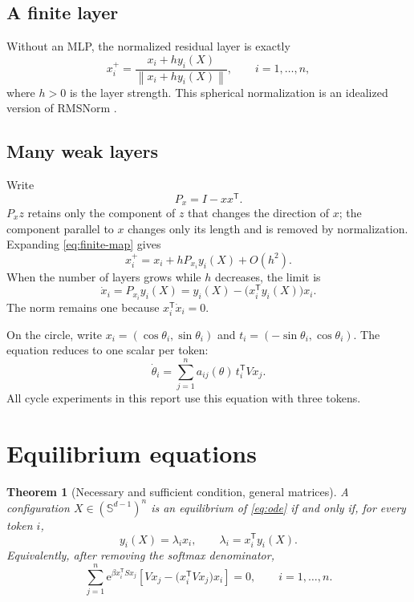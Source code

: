 \documentclass[11pt,a4paper]{article}
\newtheorem{theorem}{Theorem}[section]
\theoremstyle{definition}
\newcommand{\sphere}{\mathbb S}
\newcommand{\e}{\mathrm e}
\newcommand{\T}{\mathsf T}
\newcommand{\norm}[1]{\left\lVert #1\right\rVert}
\begin{document}
\subsection{A finite layer}

Without an MLP, the normalized residual layer is exactly
\begin{equation}
 x_i^+=\frac{x_i+h y_i(X)}{\norm{x_i+h y_i(X)}} ,
 \qquad i=1,\ldots,n,                                      \label{eq:finite-map}
\end{equation}
where $h>0$ is the layer strength. This spherical normalization is an idealized
version of RMSNorm \cite{zhang2019rmsnorm}.

\subsection{Many weak layers}

Write
\[
 P_x=I-xx^{\T}.
\]
$P_xz$ retains only the component of $z$ that changes the direction of $x$; the
component parallel to $x$ changes only its length and is removed by normalization.
Expanding \eqref{eq:finite-map} gives
\[
 x_i^+=x_i+hP_{x_i}y_i(X)+O(h^2).
\]
When the number of layers grows while $h$ decreases, the limit is
\begin{equation}
 \boxed{\quad \dot x_i=P_{x_i}y_i(X)
 =y_i(X)-\bigl(x_i^{\T}y_i(X)\bigr)x_i.\quad}              \label{eq:ode}
\end{equation}
The norm remains one because $x_i^{\T}\dot x_i=0$.

On the circle, write $x_i=(\cos\theta_i,\sin\theta_i)$ and
$t_i=(-\sin\theta_i,\cos\theta_i)$. The equation reduces to one scalar per token:
\begin{equation}
 \dot\theta_i=\sum_{j=1}^n a_{ij}(\theta)\,t_i^{\T}Vx_j.  \label{eq:circle}
\end{equation}
All cycle experiments in this report use this equation with three tokens.

\section{Equilibrium equations}
\label{sec:equilibria}

\begin{theorem}[Necessary and sufficient condition, general matrices]
\label{thm:general-equilibrium}
A configuration $X\in(\sphere^{d-1})^n$ is an equilibrium of \eqref{eq:ode} if and only
if, for every token $i$,
\begin{equation}
 \boxed{\quad y_i(X)=\lambda_i x_i,
 \qquad \lambda_i=x_i^{\T}y_i(X).\quad}                   \label{eq:parallel-condition}
\end{equation}
Equivalently, after removing the softmax denominator,
\begin{equation}
 \boxed{\quad
 \sum_{j=1}^n \e^{\beta x_i^{\T}Sx_j}
 \left[Vx_j-\bigl(x_i^{\T}Vx_j\bigr)x_i\right]=0,
 \qquad i=1,\ldots,n.\quad}                               \label{eq:final-equilibrium}
\end{equation}
\end{theorem}
\end{document}
